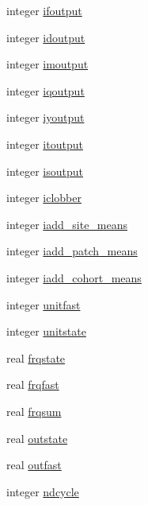 \begin{DoxyCompactItemize}
\item 
integer \hyperlink{namespaceed__misc__coms_a046bda1132eb5f39c1fe39ca6508b1ca}{ifoutput}
\item 
integer \hyperlink{namespaceed__misc__coms_ac22da5c21a601d71d683d07a3b732986}{idoutput}
\item 
integer \hyperlink{namespaceed__misc__coms_ac5c1b423c2cba321743173b47a45e456}{imoutput}
\item 
integer \hyperlink{namespaceed__misc__coms_a789850d6ec992a19b7f4b55a9a4e6a31}{iqoutput}
\item 
integer \hyperlink{namespaceed__misc__coms_ae5af5b7b96575dae64449b7cbfbd1b3f}{iyoutput}
\item 
integer \hyperlink{namespaceed__misc__coms_a7076a7e73ecdf51253a8b73c0079b723}{itoutput}
\item 
integer \hyperlink{namespaceed__misc__coms_ab282b2d1c8f6c839d29c674a1555a416}{isoutput}
\item 
integer \hyperlink{namespaceed__misc__coms_a0b50bf271a33820e2e49a4c73569359a}{iclobber}
\item 
integer \hyperlink{namespaceed__misc__coms_a173b15b7afdca1ac04fd16722535f46c}{iadd\+\_\+site\+\_\+means}
\item 
integer \hyperlink{namespaceed__misc__coms_a3ed7fe49d1b72bafa30e2c6ab9fdb104}{iadd\+\_\+patch\+\_\+means}
\item 
integer \hyperlink{namespaceed__misc__coms_ab418543f9bf77ba4d91179475d255a35}{iadd\+\_\+cohort\+\_\+means}
\item 
integer \hyperlink{namespaceed__misc__coms_a201ad3ab376db2b9861c473fa72f4ca4}{unitfast}
\item 
integer \hyperlink{namespaceed__misc__coms_a5018c6cb5f287c675aba66d451e25afc}{unitstate}
\item 
real \hyperlink{namespaceed__misc__coms_a652a6c85394c61d1c898c9c24115df34}{frqstate}
\item 
real \hyperlink{namespaceed__misc__coms_a6e6858a379b23c07604b4cadc2911eb3}{frqfast}
\item 
real \hyperlink{namespaceed__misc__coms_aa14020d7aeaff94be9333b65b7d18523}{frqsum}
\item 
real \hyperlink{namespaceed__misc__coms_ae530849702ef966f40e0afc4f65b1375}{outstate}
\item 
real \hyperlink{namespaceed__misc__coms_ae09f2e8832d84578b31d14be102b09a0}{outfast}
\item 
integer \hyperlink{namespaceed__misc__coms_ae250ef87c34b07475db0c314b6244148}{ndcycle}

\end{DoxyCompactItemize}
